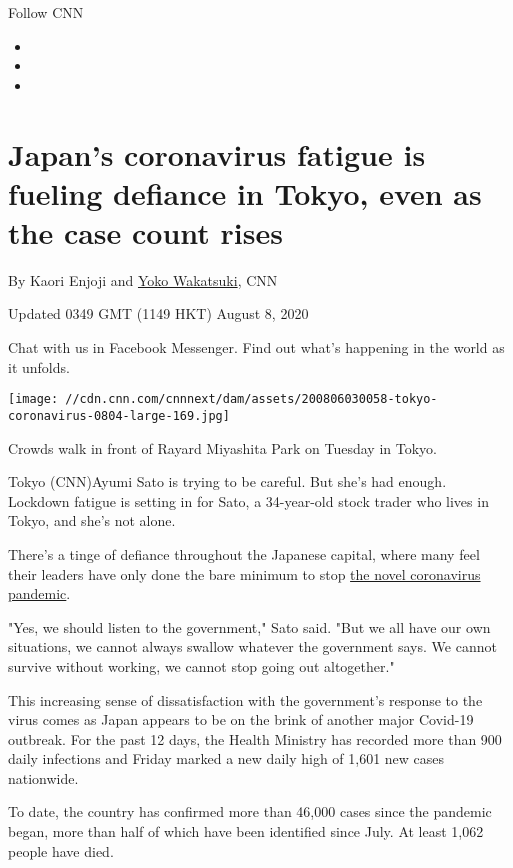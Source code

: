 Follow CNN

\begin{itemize}
\item
\item
\item
\end{itemize}

\hypertarget{japans-coronavirus-fatigue-is-fueling-defiance-in-tokyo-even-as-the-case-count-rises}{%
\section{Japan's coronavirus fatigue is fueling defiance in Tokyo, even
as the case count
rises}\label{japans-coronavirus-fatigue-is-fueling-defiance-in-tokyo-even-as-the-case-count-rises}}

By Kaori Enjoji and \href{/profiles/yoko-wakatsuki-profile}{Yoko
Wakatsuki}, CNN

Updated 0349 GMT (1149 HKT) August 8, 2020

Chat with us in Facebook Messenger. Find out what's happening in the
world as it unfolds.

\texttt{[image: //cdn.cnn.com/cnnnext/dam/assets/200806030058-tokyo-coronavirus-0804-large-169.jpg]}

Crowds walk in front of Rayard Miyashita Park on Tuesday in Tokyo.

Tokyo (CNN)Ayumi Sato is trying to be careful. But she's had enough.
Lockdown fatigue is setting in for Sato, a 34-year-old stock trader who
lives in Tokyo, and she's not alone.

There's a tinge of defiance throughout the Japanese capital, where many
feel their leaders have only done the bare minimum to stop
\href{https://www.cnn.com/specials/world/coronavirus-outbreak-intl-hnk}{the
novel coronavirus pandemic}.

"Yes, we should listen to the government," Sato said. "But we all have
our own situations, we cannot always swallow whatever the government
says. We cannot survive without working, we cannot stop going out
altogether."

This increasing sense of dissatisfaction with the government's response
to the virus comes as Japan appears to be on the brink of another major
Covid-19 outbreak. For the past 12 days, the Health Ministry has
recorded more than 900 daily infections and Friday marked a new daily
high of 1,601 new cases nationwide.

To date, the country has confirmed more than 46,000 cases since the
pandemic began, more than half of which have been identified since July.
At least 1,062 people have died.

